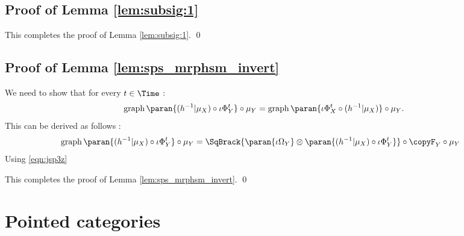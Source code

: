 \documentclass[12pt,oneside,pb-diagram]{article}
\DeclareMathOperator{\graph}{graph}
\begin{document}
\subsection{Proof of Lemma \ref{lem:subsig:1}} \label{sec:proof:subsig:1}

This completes the proof of Lemma \ref{lem:subsig:1}. \qed
\subsection{Proof of Lemma \ref{lem:sps_mrphsm_invert}} \label{sec:proof:sps_mrphsm_invert}

We need to show that for every $t\in \Time$ :
%
\[ \graph\paran{ (h^{-1}|\mu_X) \circ \iota \Phi^t_Y } \circ \mu_Y = \graph\paran{ \iota \Phi_X^t \circ (h^{-1}|\mu_X) } \circ \mu_Y . \]
%
This can be derived as follows :
%
\[\begin{split}
	& \graph\paran{ (h^{-1}|\mu_X) \circ \iota \Phi^t_Y } \circ \mu_Y = \SqBrack{ \paran{\iota\Omega_Y} \otimes \paran{ (h^{-1}|\mu_X) \circ \iota \Phi^t_Y } } \circ \copyF_Y \circ \mu_Y
\end{split}\]
%
Using \eqref{eqn:jsp3z} 

This completes the proof of Lemma \ref{lem:sps_mrphsm_invert}. \qed 

\section{Pointed categories} \label{sec:app:pointed}

\end{document}
